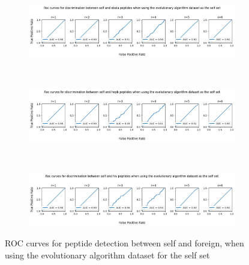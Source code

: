 \documentclass{article}
\begin{document}
\begin{figure}[ht]
    \begin{subfigure}[t]{\linewidth}
        \centering
        \includegraphics[width=\linewidth]{images/ebola_ea.png}
        \label{fig:ebola_ea}
    \end{subfigure}
    \\
    \begin{subfigure}[t]{\linewidth}
        \centering
        \includegraphics[width=\linewidth]{images/hepb_ea.png}
        \label{fig:hepb_ea}
    \end{subfigure}
        \\
    \begin{subfigure}[t]{\linewidth}
        \centering
        \includegraphics[width=\linewidth]{images/hiv_ea.png}
        \label{fig:hiv_ea}
    \end{subfigure}

    \caption{ROC curves for peptide detection between self and foreign, when using the evolutionary algorithm dataset for the self set}
    \label{fig:pept_ea}
\end{figure}
\end{document}
